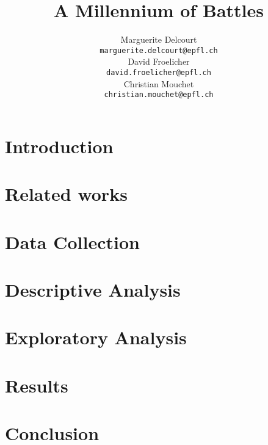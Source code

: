 \documentclass[11pt]{article}
\title{A Millennium of Battles}
\author{Marguerite Delcourt\\
  {\small \tt marguerite.delcourt@epfl.ch} \\
  \And
  David Froelicher\\
  {\small \tt david.froelicher@epfl.ch}\\
  \And
Christian Mouchet\\
{\small \tt christian.mouchet@epfl.ch} \\}
\date{}
\begin{document}
\maketitle

\begin{abstract}

\end{abstract}


\section{Introduction}


\section{Related works}


\section{Data Collection}


\section{Descriptive Analysis}


\section{Exploratory Analysis}


\section{Results}


\section{Conclusion}

\end{document}
